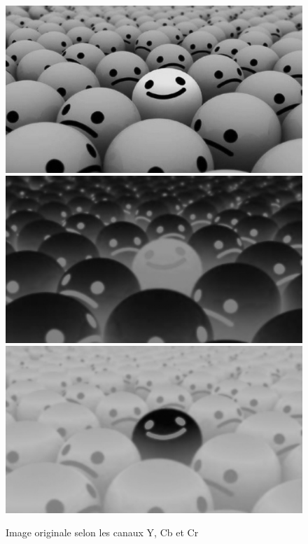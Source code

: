\documentclass[12pt]{report}
\begin{document}
\begin{figure}[H]
\begin{center}
\includegraphics[scale=0.25]{../ImageRes/Image0_channel_0.jpg} 
\includegraphics[scale=0.25]{../ImageRes/Image0_channel_1.jpg} 
\includegraphics[scale=0.25]{../ImageRes/Image0_channel_2.jpg} 
\caption{Image originale selon les canaux Y, Cb et Cr}
\end{center}
\end{figure}
\end{document}
